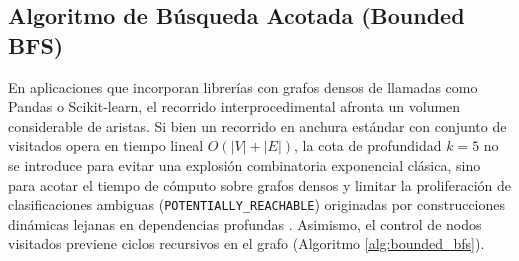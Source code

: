 \documentclass[conference]{IEEEtran}
\begin{document}
\subsection{Algoritmo de Búsqueda Acotada (Bounded BFS)}
En aplicaciones que incorporan librerías con grafos densos de llamadas como Pandas o Scikit-learn, el recorrido interprocedimental afronta un volumen considerable de aristas. Si bien un recorrido en anchura estándar con conjunto de visitados opera en tiempo lineal $O(|V| + |E|)$, la cota de profundidad $k=5$ no se introduce para evitar una explosión combinatoria exponencial clásica, sino para acotar el tiempo de cómputo sobre grafos densos y limitar la proliferación de clasificaciones ambiguas (\texttt{POTENTIALLY\_REACHABLE}) originadas por construcciones dinámicas lejanas en dependencias profundas . Asimismo, el control de nodos visitados previene ciclos recursivos en el grafo (Algoritmo \ref{alg:bounded_bfs}).
\end{document}
